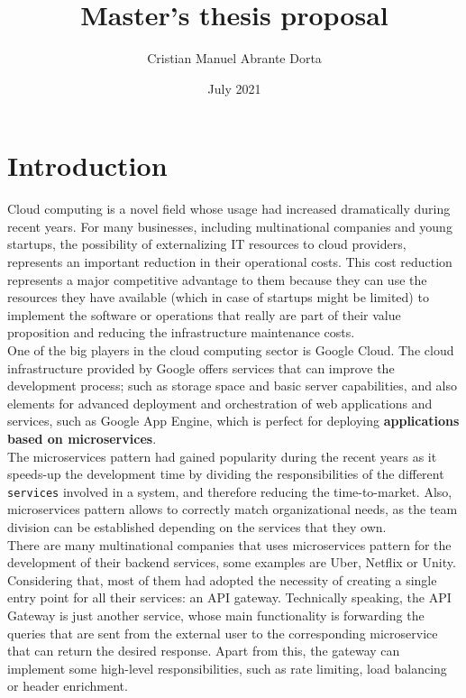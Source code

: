 \documentclass[12pt]{article}
\title{Master's thesis proposal}
\author{Cristian Manuel Abrante Dorta}
\date{July 2021}
\begin{document}
\maketitle

\section{Introduction}

Cloud computing is a novel field whose usage had increased dramatically during recent years. For many businesses, including multinational companies and young startups, the possibility of externalizing IT resources to cloud providers, represents an important reduction in their operational costs. This cost reduction represents a major competitive advantage to them because they can use the resources they have available (which in case of startups might be limited) to implement the software or operations that really are part of their value proposition and reducing the infrastructure maintenance costs.\\

One of the big players in the cloud computing sector is Google Cloud. The cloud infrastructure provided by Google offers services that can improve the development process; such as storage space and basic server capabilities, and also elements for advanced deployment and orchestration of web applications and services, such as Google App Engine, which is perfect for deploying \textbf{applications based on microservices}.\\

The microservices pattern had gained popularity during the recent years as it speeds-up the development time by dividing the responsibilities of the different \texttt{services} involved in a system, and therefore reducing the time-to-market. Also, microservices pattern allows to correctly match organizational needs, as the team division can be established depending on the services that they own.\\

There are many multinational companies that uses microservices pattern for the development of their backend services, some examples are Uber, Netflix or Unity. Considering that, most of them had adopted the necessity of creating a single entry point for all their services: an API gateway. Technically speaking, the API Gateway is just another service, whose main functionality is forwarding the queries that are sent from the external user to the corresponding microservice that can return the desired response. Apart from this, the gateway can implement some high-level responsibilities, such as rate limiting, load balancing or header enrichment.\\
\end{document}
